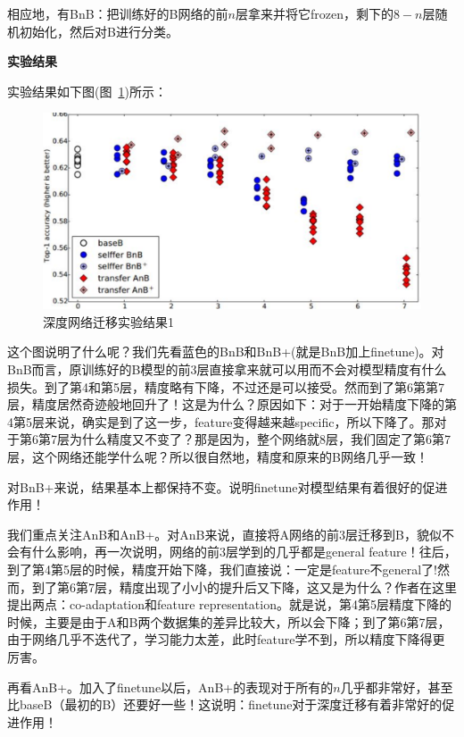 相应地，有BnB：把训练好的B网络的前$n$层拿来并将它frozen，剩下的$8-n$层随机初始化，然后对B进行分类。

\textbf{实验结果}

实验结果如下图(图~\ref{fig-8-2})所示：

\begin{figure}[htbp]
	\centering
	\includegraphics[scale=0.5]{figures/fig-8_1.pdf}
	\caption{深度网络迁移实验结果1}
	\label{fig-8-2}
\end{figure}

这个图说明了什么呢？我们先看蓝色的BnB和BnB+(就是BnB加上finetune)。对BnB而言，原训练好的B模型的前3层直接拿来就可以用而不会对模型精度有什么损失。到了第4和第5层，精度略有下降，不过还是可以接受。然而到了第6第第7层，精度居然奇迹般地回升了！这是为什么？原因如下：对于一开始精度下降的第4第5层来说，确实是到了这一步，feature变得越来越specific，所以下降了。那对于第6第7层为什么精度又不变了？那是因为，整个网络就8层，我们固定了第6第7层，这个网络还能学什么呢？所以很自然地，精度和原来的B网络几乎一致！

对BnB+来说，结果基本上都保持不变。说明finetune对模型结果有着很好的促进作用！

我们重点关注AnB和AnB+。对AnB来说，直接将A网络的前3层迁移到B，貌似不会有什么影响，再一次说明，网络的前3层学到的几乎都是general feature！往后，到了第4第5层的时候，精度开始下降，我们直接说：一定是feature不general了!然而，到了第6第7层，精度出现了小小的提升后又下降，这又是为什么？作者在这里提出两点：co-adaptation和feature representation。就是说，第4第5层精度下降的时候，主要是由于A和B两个数据集的差异比较大，所以会下降；到了第6第7层，由于网络几乎不迭代了，学习能力太差，此时feature学不到，所以精度下降得更厉害。

再看AnB+。加入了finetune以后，AnB+的表现对于所有的$n$几乎都非常好，甚至比baseB（最初的B）还要好一些！这说明：finetune对于深度迁移有着非常好的促进作用！

